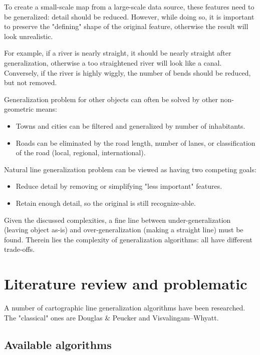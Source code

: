 \documentclass[a4paper]{article}
\newcommand{\DP}{Douglas \& Peucker}
\newcommand{\VW}{Visvalingam--Whyatt}
\begin{document}
To create a small-scale map from a large-scale data source, these features need
to be generalized: detail should be reduced. However, while doing so, it is
important to preserve the "defining" shape of the original feature, otherwise
the result will look unrealistic.

For example, if a river is nearly straight, it should be nearly straight after
generalization, otherwise a too straightened river will look like a canal.
Conversely, if the river is highly wiggly, the number of bends should be
reduced, but not removed.

Generalization problem for other objects can often be solved by other
non-geometric means:

\begin{itemize}
    \item Towns and cities can be filtered and generalized by number of
        inhabitants.
    \item Roads can be eliminated by the road length, number of lanes, or
        classification of the road (local, regional, international).
\end{itemize}

Natural line generalization problem can be viewed as having two competing
goals:

\begin{itemize}
    \item Reduce detail by removing or simplifying "less important" features.
    \item Retain enough detail, so the original is still recognize-able.
\end{itemize}

Given the discussed complexities, a fine line between under-generalization
(leaving object as-is) and over-generalization (making a straight line) must be
found. Therein lies the complexity of generalization algorithms: all have
different trade-offs.

\section{Literature review and problematic}
\label{sec:literature-review}

A number of cartographic line generalization algorithms have been researched.
The "classical" ones are {\DP} and {\VW}.

\subsection{Available algorithms}
\end{document}
